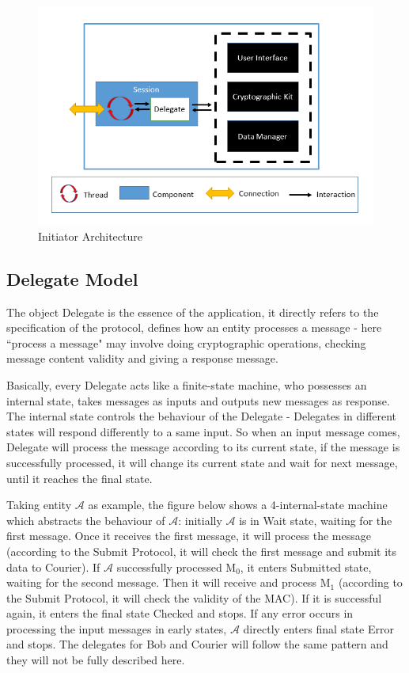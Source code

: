 \begin{figure}[h!]
\centering
\includegraphics[width=\textwidth,natwidth=700,natheight=456]{figures/initiatorarchitecture.png}
\caption{Initiator Architecture}
\label{fig:initiator}
\end{figure}

\subsection{Delegate Model}
The object Delegate is the essence of the application, it directly refers to the specification of the protocol, defines how an entity processes a message - here ``process a message" may involve doing cryptographic operations, checking message content validity and giving a response message.

Basically, every Delegate acts like a finite-state machine, who possesses an internal state, takes messages as inputs and outputs new messages as response. The internal state controls the behaviour of the Delegate - Delegates in different states will respond differently to a same input. So when an input message comes, Delegate will process the message according to its current state, if the message is successfully processed, it will change its current state and wait for next message, until it reaches the final state. 

Taking entity $\mathcal{A}$ as example, the figure below shows a 4-internal-state machine which abstracts the behaviour of $\mathcal{A}$: initially $\mathcal{A}$ is in Wait state, waiting for the first message. Once it receives the first message, it will process the message (according to the Submit Protocol, it will check the first message and submit its data to Courier). If $\mathcal{A}$ successfully processed M$_0$, it enters Submitted state, waiting for the second message. Then it will receive and process M$_1$ (according to the Submit Protocol, it will check the validity of the MAC).  If it is successful again, it enters the final state Checked and stops. If any error occurs in processing the input messages in early states, $\mathcal{A}$ directly enters final state Error and stops. The delegates for Bob and Courier will follow the same pattern and they will not be fully described here.

